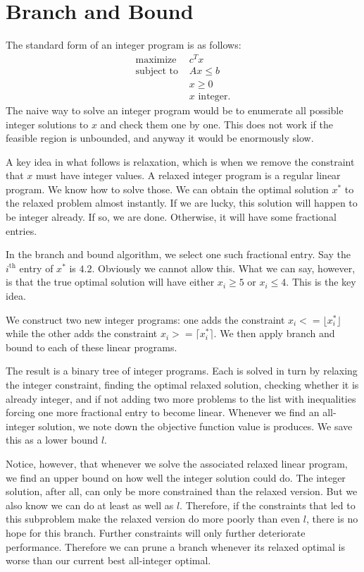 \documentclass{article}
\begin{document}
\section*{Branch and Bound}

The standard form of an integer program is as follows: \begin{align*}
    \text{maximize } & c^T x \\ 
    \text{subject to } & Ax \leq b \\
    & x \geq 0 \\
    & x \text{ integer}.
\end{align*} The naive way to solve an integer program would be to enumerate all possible integer solutions to $x$ and check them one by one. This does not work if the feasible region is unbounded, and anyway it would be enormously slow.

A key idea in what follows is relaxation, which is when we remove the constraint that $x$ must have integer values. A relaxed integer program is a regular linear program. We know how to solve those. We can obtain the optimal solution $x^\ast$ to the relaxed problem almost instantly. If we are lucky, this solution will happen to be integer already. If so, we are done. Otherwise, it will have some fractional entries.

In the branch and bound algorithm, we select one such fractional entry. Say the $i^\text{th}$ entry of $x^\ast$ is $4.2$. Obviously we cannot allow this. What we can say, however, is that the true optimal solution will have either $x_i \geq 5$ or $x_i \leq 4$. This is the key idea.

We construct two new integer programs: one adds the constraint $x_i <= \lfloor x_i^\ast \rfloor$ while the other adds the constraint $x_i >= \lceil x_i^\ast \rceil$. We then apply branch and bound to each of these linear programs.

The result is a binary tree of integer programs. Each is solved in turn by relaxing the integer constraint, finding the optimal relaxed solution, checking whether it is already integer, and if not adding two more problems to the list with inequalities forcing one more fractional entry to become linear. Whenever we find an all-integer solution, we note down the objective function value is produces. We save this as a lower bound $l$.

Notice, however, that whenever we solve the associated relaxed linear program, we find an upper bound on how well the integer solution could do. The integer solution, after all, can only be more constrained than the relaxed version. But we also know we can do at least as well as $l$. Therefore, if the constraints that led to this subproblem make the relaxed version do more poorly than even $l$, there is no hope for this branch. Further constraints will only further deteriorate performance. Therefore we can prune a branch whenever its relaxed optimal is worse than our current best all-integer optimal.
\end{document}
